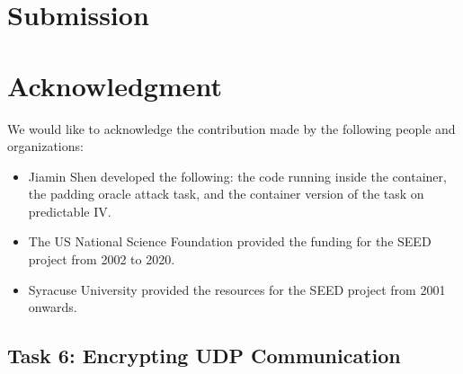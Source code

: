 \section{Submission}





\section{Acknowledgment}

We would like to acknowledge the contribution made by the following people and organizations:

\begin{itemize}
\item Jiamin Shen developed the following: the code running inside the container, 
      the padding oracle attack task, and the container version of the 
      task on predictable IV.

\item The US National Science Foundation provided the funding for the SEED project from 2002 
      to 2020.

\item Syracuse University provided the resources for the SEED project from 2001 onwards.
\end{itemize}
 










\subsection{Task 6: Encrypting UDP Communication}


